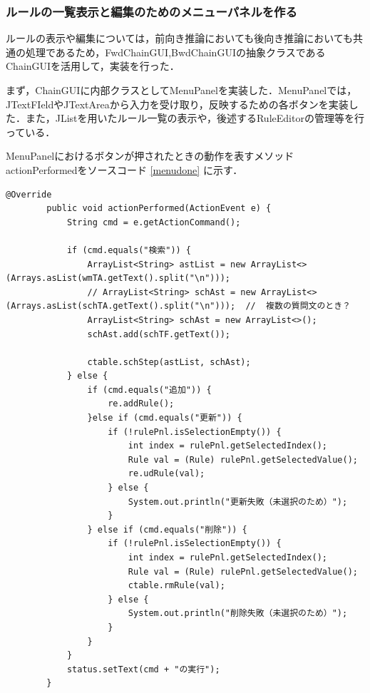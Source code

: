 \documentclass[12pt]{jarticle}
\begin{document}
\subsubsection{ルールの一覧表示と編集のためのメニューパネルを作る}
ルールの表示や編集については，前向き推論においても後向き推論においても共通の処理であるため，FwdChainGUI,BwdChainGUIの抽象クラスであるChainGUIを活用して，実装を行った．

まず，ChainGUIに内部クラスとしてMenuPanelを実装した．MenuPanelでは，JTextFIeldやJTextAreaから入力を受け取り，反映するための各ボタンを実装した．また，JListを用いたルール一覧の表示や，後述するRuleEditorの管理等を行っている．

MenuPanelにおけるボタンが押されたときの動作を表すメソッドactionPerformedをソースコード
\ref{menudone}
に示す．

\begin{lstlisting}[caption=RuleEditorクラスのメソッドactionPerformed, label=menudone]
        @Override
        public void actionPerformed(ActionEvent e) {
            String cmd = e.getActionCommand();

            if (cmd.equals("検索")) {
                ArrayList<String> astList = new ArrayList<>(Arrays.asList(wmTA.getText().split("\n")));
                // ArrayList<String> schAst = new ArrayList<>(Arrays.asList(schTA.getText().split("\n")));  //  複数の質問文のとき？
                ArrayList<String> schAst = new ArrayList<>();
                schAst.add(schTF.getText());

                ctable.schStep(astList, schAst);
            } else {
                if (cmd.equals("追加")) {
                    re.addRule();
                }else if (cmd.equals("更新")) {
                    if (!rulePnl.isSelectionEmpty()) {
                        int index = rulePnl.getSelectedIndex();
                        Rule val = (Rule) rulePnl.getSelectedValue();
                        re.udRule(val);
                    } else {
                        System.out.println("更新失敗（未選択のため）");
                    }
                } else if (cmd.equals("削除")) {
                    if (!rulePnl.isSelectionEmpty()) {
                        int index = rulePnl.getSelectedIndex();
                        Rule val = (Rule) rulePnl.getSelectedValue();
                        ctable.rmRule(val);
                    } else {
                        System.out.println("削除失敗（未選択のため）");
                    }
                }
            }
            status.setText(cmd + "の実行");
        }
\end{lstlisting}
\end{document}
